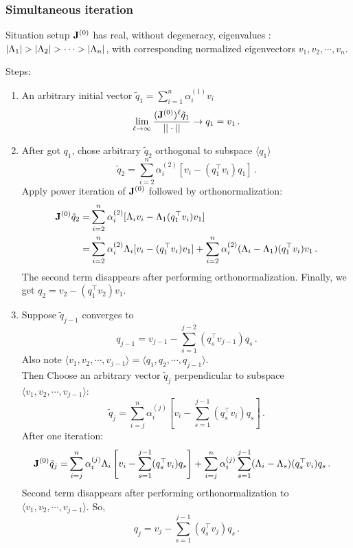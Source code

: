 \documentclass[mathserif, handout]{beamer}
\begin{document}
\logofalse
\begin{frame}[allowframebreaks]
  \frametitle{Simultaneous iteration \cite{Trefethen97}}
  \begin{block}{Situation setup}
    $\mathbf{J}^{(0)}$ has real, without degeneracy, eigenvalues
    : $|\ExpaEig_{1}|>|\ExpaEig_{2}|>\cdots >|\ExpaEig_{n}|$, with
    corresponding normalized eigenvectors $v_{1},v_{2},\cdots ,v_{n}$.
  \end{block}
  Steps:
  \begin{enumerate}
  \item An arbitrary initial vector
    $\tilde{q}_{1}=\sum_{i=1}^{n}\alpha^{(1)}_{i}v_{i}$
    \[
    \lim_{\ell\to \infty }\frac{(\mathbf{J}^{(0)})^{\ell}\tilde{q}_{1}}{||\cdot||}
    \to q_{1}=v_{1}
    \,.
    \]
  
  \item After got $q_1$, chose arbitrary $\tilde{q}_{2}$ orthogonal to 
    subspace $\langle q_{1} \rangle$
    \[
    \tilde{q}_{2}= \sum_{i=2}^{n}\alpha^{(2)}_{i}[v_{i}-(q_{1}^\top
    v_{i})q_{1}]
    \,.
    \]
    Apply power
    iteration of $\mathbf{J}^{(0)}$ followed by orthonormalization:
    \begin{align*}
      \mathbf{J}^{(0)}\tilde{q}_{2}= &\sum_{i=2}^{n}\alpha^{(2)}_{i}
      [\Lambda_{i}v_{i}-\Lambda_{1}(q_{1}^\top v_{i})v_{1}] \\
      = & \sum_{i=2}^{n}\alpha^{(2)}_{i}\Lambda_{i}[v_{i}-
      (q_{1}^\top v_{i})v_{1}]+\sum_{i=2}^{n}\alpha^{(2)}_{i}
      (\Lambda_{i}-\Lambda_{1})(q_{1}^\top v_{i})v_{1}
      \,.
    \end{align*}
    The second term disappears after performing orthonormalization.
    Finally, we get $q_{2}=v_{2}-(q_{1}^\top v_{2})v_{1}$.
    
  
  \item Suppose $\tilde{q}_{j-1}$ converges to
    \[
    q_{j-1}=v_{j-1}-\sum_{s=1}^{j-2}(q_{s}^\top v_{j-1})q_{s}
    \,.
    \]
    Also note $\langle v_{1},v_{2},\cdots,v_{j-1}\rangle=\langle
    q_{1},q_{2},\cdots,q_{j-1}\rangle$. \\ 
    Then Choose an arbitrary vector
    $\tilde{q}_{j}$ perpendicular to subspace $\langle
    v_{1},v_{2},\cdots,v_{j-1}\rangle$:
    \[
    \tilde{q}_{j}=\sum_{i=j}^{n}\alpha_{i}^{(j)}[v_{i}-\sum_{s=1}^{j-1}
    (q^\top _{s}v_{i})q_{s}]
    \,.
    \]
    After one iteration:
    \begin{align*}
      \mathbf{J}^{(0)}\tilde{q}_{j}
      = & \sum_{i=j}^{n}\alpha^{(j)}_{i}\Lambda_{i}
      \left[v_{i}-\sum_{s=1}^{j-1}(q_{s}^\top v_{i})q_{s}\right]
      +
      \sum_{i=j}^{n}\alpha^{(j)}_{i}\sum_{s=1}^{j-1}
      (\Lambda_{i}-\Lambda_{s})(q_{s}^\top v_{i})q_{s}
      \,.
    \end{align*}
    Second term disappears after performing orthonormalization to 
    $\langle  v_{1},v_{2},\cdots,v_{j-1}\rangle$.
    So,
    \[
    q_{j}=v_{j}-\sum_{s=1}^{j-1}(q_{s}^\top v_{j})q_{s}
    \,.
    \] 
  \end{enumerate}
  

\end{frame}
\end{document}
